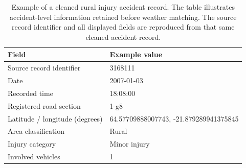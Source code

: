\begin{table}[htbp]
\centering
\small
\caption[Example of a cleaned rural injury accident record.]{Example of a cleaned rural injury accident record. The table illustrates accident-level information retained before weather matching. The source record identifier and all displayed fields are reproduced from that same cleaned accident record.}
\label{tab:cleaned-accident-example}
\begin{tabular}{ll}
\toprule
Field & Example value \\
\midrule
Source record identifier & 3168111 \\ \grayhline
Date & 2007-01-03 \\ \grayhline
Recorded time & 18:08:00 \\ \grayhline
Registered road section & 1-g8 \\ \grayhline
Latitude / longitude (degrees) & 64.57709888007743, -21.879289941375845 \\ \grayhline
Area classification & Rural \\ \grayhline
Injury category & Minor injury \\ \grayhline
Involved vehicles & 1 \\
\bottomrule
\end{tabular}
\end{table}
